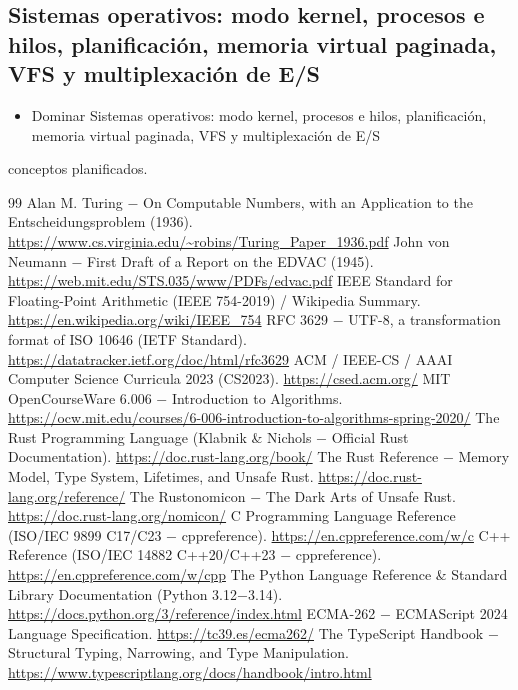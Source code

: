 \documentclass{book}
\begin{document}
\subsection*{\checkmark Sistemas operativos: modo kernel, procesos e hilos, planificación, memoria virtual paginada, VFS y multiplexación de E/S}
\begin{itemize}
\item Dominar Sistemas operativos: modo kernel, procesos e hilos, planificación, memoria virtual paginada, VFS y multiplexación de E/S
\end{itemize}
 conceptos planificados.
\backmatter
\begin{thebibliography}{99}
 Alan M. Turing \(-\) On Computable Numbers, with an Application to the Entscheidungsproblem (1936). \url{https://www.cs.virginia.edu/~robins/Turing_Paper_1936.pdf}
 John von Neumann \(-\) First Draft of a Report on the EDVAC (1945). \url{https://web.mit.edu/STS.035/www/PDFs/edvac.pdf}
 IEEE Standard for Floating-Point Arithmetic (IEEE 754-2019) / Wikipedia Summary. \url{https://en.wikipedia.org/wiki/IEEE_754}
 RFC 3629 \(-\) UTF-8, a transformation format of ISO 10646 (IETF Standard). \url{https://datatracker.ietf.org/doc/html/rfc3629}
 ACM / IEEE-CS / AAAI Computer Science Curricula 2023 (CS2023). \url{https://csed.acm.org/}
 MIT OpenCourseWare 6.006 \(-\) Introduction to Algorithms. \url{https://ocw.mit.edu/courses/6-006-introduction-to-algorithms-spring-2020/}
 The Rust Programming Language (Klabnik \& Nichols \(-\) Official Rust Documentation). \url{https://doc.rust-lang.org/book/}
 The Rust Reference \(-\) Memory Model, Type System, Lifetimes, and Unsafe Rust. \url{https://doc.rust-lang.org/reference/}
 The Rustonomicon \(-\) The Dark Arts of Unsafe Rust. \url{https://doc.rust-lang.org/nomicon/}
 C Programming Language Reference (ISO/IEC 9899 C17/C23 \(-\) cppreference). \url{https://en.cppreference.com/w/c}
 C++ Reference (ISO/IEC 14882 C++20/C++23 \(-\) cppreference). \url{https://en.cppreference.com/w/cpp}
 The Python Language Reference \& Standard Library Documentation (Python 3.12\(-\)3.14). \url{https://docs.python.org/3/reference/index.html}
 ECMA-262 \(-\) ECMAScript 2024 Language Specification. \url{https://tc39.es/ecma262/}
 The TypeScript Handbook \(-\) Structural Typing, Narrowing, and Type Manipulation. \url{https://www.typescriptlang.org/docs/handbook/intro.html}

\end{thebibliography}
\end{document}
